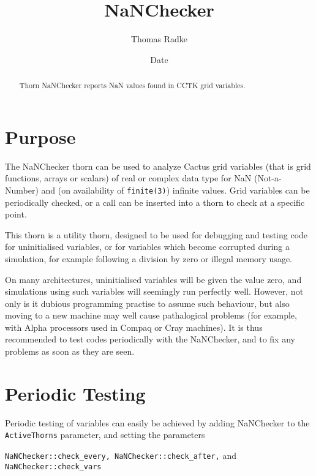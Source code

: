 \documentclass{article}
\begin{document}
\title{NaNChecker}
\author{Thomas Radke}
\date{$ $Date$ $}

\maketitle


\begin{abstract}
Thorn NaNChecker reports NaN values found in CCTK grid variables.
\end{abstract}


\section{Purpose}

The NaNChecker thorn can be used to analyze Cactus grid variables (that is grid
functions, arrays or scalars) of real or complex data type for NaN
(Not-a-Number) and (on availability of {\tt finite(3)}) infinite
values. Grid variables can be periodically checked, or a call can 
be inserted into a thorn to check at a specific point.

This thorn is a utility thorn, designed to be used for debugging and
testing code for uninitialised variables, or for variables which 
become corrupted during a simulation, for example following a division
by zero or illegal memory usage.

On many architectures, uninitialised variables will be given the value
zero, and simulations using such variables will seemingly run perfectly 
well. However, not only is it dubious programming practise to assume such
behaviour, but also moving to a new machine may well cause pathalogical 
problems (for example, with Alpha processors used in Compaq or Cray machines).
It is thus recommended to test codes periodically with the NaNChecker, 
and to fix any problems as soon as they are seen.

\section{Periodic Testing}

Periodic testing of variables can easily be achieved by adding NaNChecker
to the {\tt ActiveThorns} parameter, and setting the parameters 

\noindent
{\tt NaNChecker::check\_every, NaNChecker::check\_after,} and {\tt NaNChecker::check\_vars} 
\end{document}
